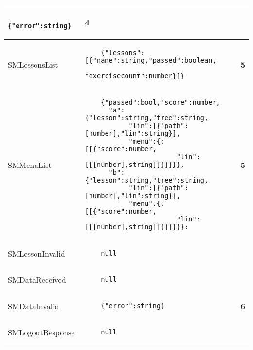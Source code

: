 \documentclass{scrartcl}
\begin{document}
\begin{tabular}{lll}
\begin{lstlisting}
    {"error":string}
  \end{lstlisting} & {\bfseries\footnotesize 4} \\
  \hline
  SMLessonsList &
  \begin{lstlisting}
    {"lessons":[{"name":string,"passed":boolean,
                 "exercisecount":number}]}
  \end{lstlisting} & {\bfseries\footnotesize 5} \\
  \hline
  SMMenuList &
  \begin{lstlisting}
    {"passed":bool,"score":number,
      "a":{"lesson":string,"tree":string,
           "lin":[{"path":[number],"lin":string}],
           "menu":{:[[{"score":number,
                       "lin":[[[number],string]]}]]}},
      "b":{"lesson":string,"tree":string,
           "lin":[{"path":[number],"lin":string}],
           "menu":{:[[{"score":number,
                       "lin":[[[number],string]]}]]}}}:
  \end{lstlisting} & {\bfseries\footnotesize 5} \\
  \hline
  SMLessonInvalid &
  \begin{lstlisting}
    null
  \end{lstlisting} \\
  \hline
  SMDataReceived &
  \begin{lstlisting}
    null
  \end{lstlisting} \\
  \hline
  SMDataInvalid &
  \begin{lstlisting}
    {"error":string}
  \end{lstlisting} & {\bfseries\footnotesize 6} \\
  \hline
  SMLogoutResponse &
  \begin{lstlisting}
    null
  \end{lstlisting} \\
  \hline
\end{tabular}
\end{document}
